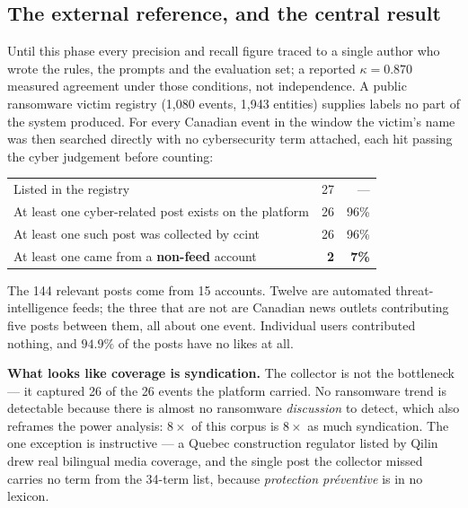 \documentclass[11pt]{article}
\begin{document}
\subsection*{The external reference, and the central result}

Until this phase every precision and recall figure traced to a single author
who wrote the rules, the prompts and the evaluation set; a reported
$\kappa = 0.870$ measured agreement under those conditions, not independence. A
public ransomware victim registry (1{,}080 events, 1{,}943 entities) supplies
labels no part of the system produced. For every Canadian event in the window
the victim's name was then searched directly with no cybersecurity term
attached, each hit passing the cyber judgement before counting:

\begin{center}\small
\begin{tabularx}{.93\linewidth}{@{}Lrr@{}}
\toprule
{} &  &  \\
\midrule
Listed in the registry                                   & 27 & --- \\
At least one cyber-related post exists on the platform   & 26 & 96\% \\
At least one such post was collected by ccint            & 26 & 96\% \\
At least one came from a \textbf{non-feed} account       & \textbf{2} & \textbf{7\%} \\
\bottomrule
\end{tabularx}
\end{center}

The 144 relevant posts come from 15 accounts. Twelve are automated
threat-intelligence feeds; the three that are not are Canadian news outlets
contributing five posts between them, all about one event. Individual users
contributed nothing, and $94.9\%$ of the posts have no likes at all.

\begin{keybox}
\textbf{What looks like coverage is syndication.} The collector is not the
bottleneck --- it captured 26 of the 26 events the platform carried. No
ransomware trend is detectable because there is almost no ransomware
\emph{discussion} to detect, which also reframes the power analysis: $8\times$
of this corpus is $8\times$ as much syndication. The one exception is
instructive --- a Quebec construction regulator listed by Qilin drew real
bilingual media coverage, and the single post the collector missed carries no
term from the 34-term list, because \emph{protection pr\'eventive} is in no
lexicon.
\end{keybox}
\end{document}

